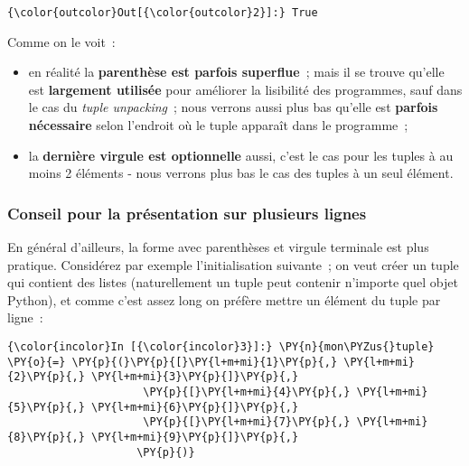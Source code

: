 \begin{Verbatim}[commandchars=\\\{\},frame=single,framerule=0.3mm,rulecolor=\color{cellframecolor}]
{\color{outcolor}Out[{\color{outcolor}2}]:} True
\end{Verbatim}
            
    Comme on le voit~:

\begin{itemize}
\tightlist
\item
  en réalité la \textbf{parenthèse est parfois superflue}~; mais il se
  trouve qu'elle est \textbf{largement utilisée} pour améliorer la
  lisibilité des programmes, sauf dans le cas du \emph{tuple
  unpacking}~; nous verrons aussi plus bas qu'elle est \textbf{parfois
  nécessaire} selon l'endroit où le tuple apparaît dans le programme~;
\item
  la \textbf{dernière virgule est optionnelle} aussi, c'est le cas pour
  les tuples à au moins 2 éléments - nous verrons plus bas le cas des
  tuples à un seul élément.
\end{itemize}

    \hypertarget{conseil-pour-la-pruxe9sentation-sur-plusieurs-lignes}{%
\subsubsection{Conseil pour la présentation sur plusieurs
lignes}\label{conseil-pour-la-pruxe9sentation-sur-plusieurs-lignes}}

    En général d'ailleurs, la forme avec parenthèses et virgule terminale
est plus pratique. Considérez par exemple l'initialisation suivante~; on
veut créer un tuple qui contient des listes (naturellement un tuple peut
contenir n'importe quel objet Python), et comme c'est assez long on
préfère mettre un élément du tuple par ligne~:

    \begin{Verbatim}[commandchars=\\\{\},frame=single,framerule=0.3mm,rulecolor=\color{cellframecolor}]
{\color{incolor}In [{\color{incolor}3}]:} \PY{n}{mon\PYZus{}tuple} \PY{o}{=} \PY{p}{(}\PY{p}{[}\PY{l+m+mi}{1}\PY{p}{,} \PY{l+m+mi}{2}\PY{p}{,} \PY{l+m+mi}{3}\PY{p}{]}\PY{p}{,}
                     \PY{p}{[}\PY{l+m+mi}{4}\PY{p}{,} \PY{l+m+mi}{5}\PY{p}{,} \PY{l+m+mi}{6}\PY{p}{]}\PY{p}{,}
                     \PY{p}{[}\PY{l+m+mi}{7}\PY{p}{,} \PY{l+m+mi}{8}\PY{p}{,} \PY{l+m+mi}{9}\PY{p}{]}\PY{p}{,}
                    \PY{p}{)}
\end{Verbatim}


